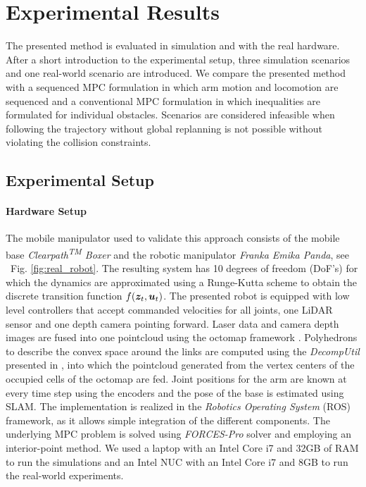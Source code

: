 \section{Experimental Results}
\label{experimental_results}

The presented method is evaluated in simulation and with the real hardware. After a short introduction to the experimental setup, three simulation scenarios and one real-world scenario are introduced. We compare the presented method with a sequenced MPC formulation in which arm motion and locomotion are sequenced and a conventional MPC formulation in which inequalities are formulated for individual obstacles. Scenarios are considered infeasible when following the trajectory without global replanning is not possible without violating the collision constraints.
%
\subsection{Experimental Setup}%
\label{sub:experimental_setup}

\paragraph{Hardware Setup}
The mobile manipulator used to validate this approach consists of the mobile base \textit{Clearpath\textsuperscript{TM} Boxer} and the robotic manipulator \textit{Franka Emika Panda}, see ~{Fig. \ref{fig:real_robot}}. The
resulting system has 10 degrees of freedom (DoF's) for which
the dynamics are approximated using a Runge-Kutta scheme to
obtain the discrete transition function $f(\bm{z}_t, \bm{u}_t)$.
The presented robot is equipped with low level controllers that accept commanded velocities
for all joints, one LiDAR sensor  and one
depth camera pointing forward. Laser data and camera depth images are fused into one
pointcloud using the octomap framework \cite{Hornung2013}. Polyhedrons to describe the
convex space around the links are computed using the \textit{DecompUtil} presented in
\cite{Liu2017}, into which the pointcloud generated from the vertex centers of the
occupied cells of the octomap are fed.
Joint positions for the arm are known at every time step using the encoders and the pose
of the base is estimated using SLAM.
The implementation is realized in the \textit{Robotics Operating System} (ROS) framework, as it
allows simple integration of the different components. The underlying MPC
problem is solved using \textit{FORCES-Pro} solver \cite{forcespro} and employing an interior-point method\cite{FORCESNLP}. We used a laptop with an Intel Core i7 and 32GB of RAM to run the simulations and an Intel NUC with an Intel Core i7 and 8GB to run the real-world experiments.

